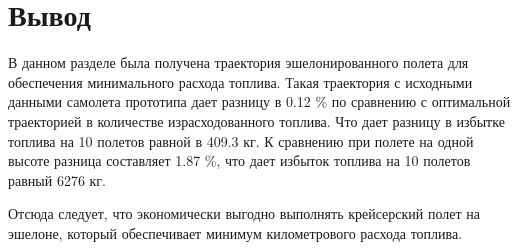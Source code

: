 \section{Вывод}
В данном разделе была получена траектория эшелонированного полета для
обеспечения минимального расхода топлива. Такая траектория с исходными данными
самолета прототипа дает разницу в 0.12 \% по сравнению с оптимальной
траекторией в количестве израсходованного топлива. Что дает разницу в избытке
топлива на 10 полетов равной в 409.3 кг. К сравнению при полете на одной высоте
разница составляет 1.87 \%, что дает избыток топлива на 10 полетов равный 6276
кг.

Отсюда следует, что экономически выгодно выполнять крейсерский полет на
эшелоне, который обеспечивает минимум километрового расхода топлива. 

